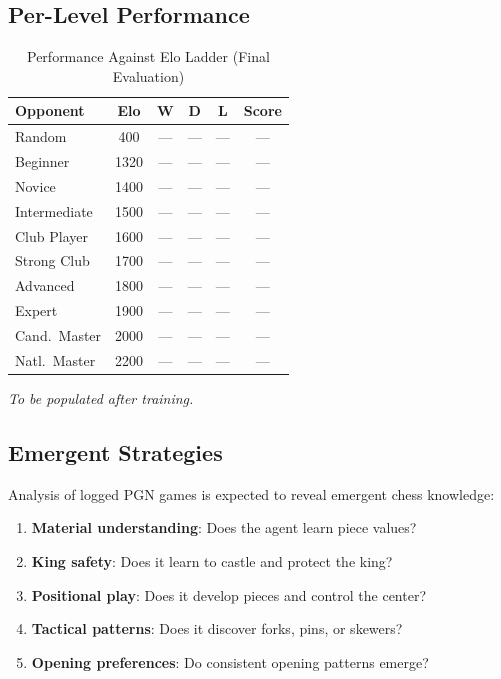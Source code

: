 \documentclass[11pt, twocolumn]{article}
\begin{document}
\subsection{Per-Level Performance}

\begin{table}[H]
\centering
\caption{Performance Against Elo Ladder (Final Evaluation)}
\label{tab:elo_results}
\small
\begin{tabular}{@{}lccccc@{}}
\toprule
\textbf{Opponent} & \textbf{Elo} & \textbf{W} & \textbf{D} & \textbf{L} & \textbf{Score} \\
\midrule
Random         & 400  & --- & --- & --- & --- \\
Beginner       & 1320 & --- & --- & --- & --- \\
Novice         & 1400 & --- & --- & --- & --- \\
Intermediate   & 1500 & --- & --- & --- & --- \\
Club Player    & 1600 & --- & --- & --- & --- \\
Strong Club    & 1700 & --- & --- & --- & --- \\
Advanced       & 1800 & --- & --- & --- & --- \\
Expert         & 1900 & --- & --- & --- & --- \\
Cand.\ Master  & 2000 & --- & --- & --- & --- \\
Natl.\ Master  & 2200 & --- & --- & --- & --- \\
\bottomrule
\end{tabular}
\vspace{0.3em}

\textit{To be populated after training.}
\end{table}

\subsection{Emergent Strategies}
Analysis of logged PGN games is expected to reveal emergent chess knowledge:

\begin{enumerate}[leftmargin=*, itemsep=2pt]
    \item \textbf{Material understanding}: Does the agent learn piece values?
    \item \textbf{King safety}: Does it learn to castle and protect the king?
    \item \textbf{Positional play}: Does it develop pieces and control the center?
    \item \textbf{Tactical patterns}: Does it discover forks, pins, or skewers?
    \item \textbf{Opening preferences}: Do consistent opening patterns emerge?
\end{enumerate}
\end{document}
